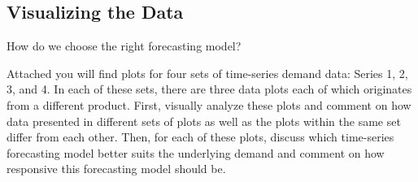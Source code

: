 \subsection{Visualizing the Data}

\begin{exercise}
How do we choose the right forecasting model?

\end{exercise}

\begin{exercise} \label{plots} 
Attached you will find plots for four sets of time-series demand data: Series 1, 2, 3, and 4. In each of these sets, there are three data plots each of which originates from a different product. First, visually analyze these plots and comment on how data presented in different sets of plots as well as the plots within the same set differ from each other. Then, for each of these plots, discuss which time-series forecasting model better suits the underlying demand and comment on how responsive this forecasting model should be.

\end{exercise}


